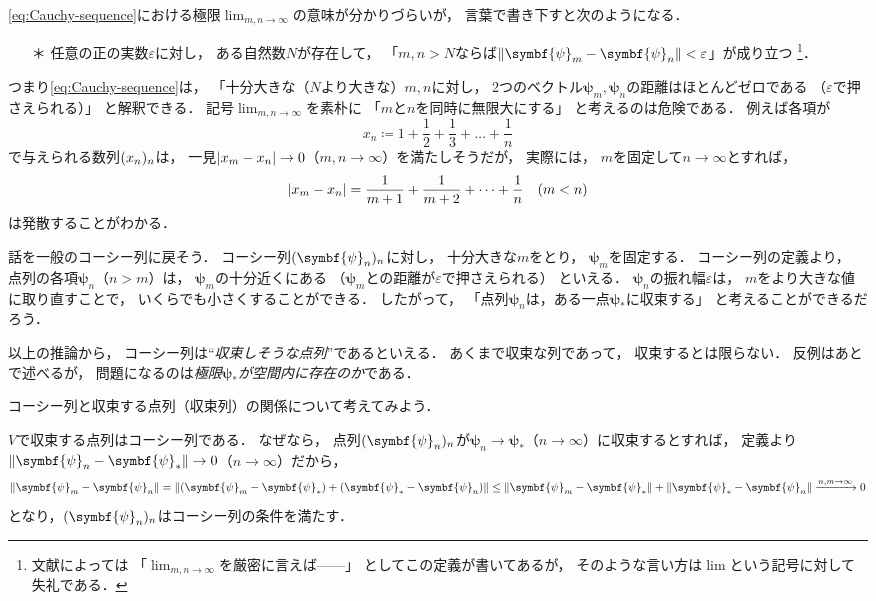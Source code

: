 \documentclass[
]{sotsu}
\newcommand{\bpsi}{\symbf{\psi}}
\newcommand{\fire}[1]{\textcolor{fire}{#1}}
\newcommand{\water}[1]{\textcolor{water}{#1}}
\begin{document}
\cref{eq:Cauchy-sequence}における極限$\lim_{m, n \to \infty}$の意味が分かりづらいが，
言葉で書き下すと次のようになる．
\begin{enumerate}
    \item [＊] \fire{任意の正の実数$\varepsilon$}に対し，
        \water{ある自然数$N$}が存在して，
        「$m, n > N$ならば$\norm{\bpsi_m - \bpsi_n} < \varepsilon$」が成り立つ%
        \footnote{
            文献によっては
            「$\lim_{m, n \to \infty}$を厳密に言えば------」
            としてこの定義が書いてあるが，
            そのような言い方は$\lim$という記号に対して失礼である．
        }．
\end{enumerate}
つまり\cref{eq:Cauchy-sequence}は，
「十分大きな{\small （$N$より大きな）}$m, n$に対し，
2つのベクトル$\bpsi_m, \bpsi_n$の距離はほとんどゼロである
{\small （$\varepsilon$で押さえられる）}」
と解釈できる．
記号$\lim_{m, n \to \infty}$を素朴に
「$m$と$n$を同時に無限大にする」
と考えるのは危険である．
例えば各項が
\begin{equation*}
    x_n \coloneq 1 + \frac{1}{2} + \frac{1}{3} + \dots + \frac{1}{n}
\end{equation*}
で与えられる数列$\sequ{x_n}[n]$は，
一見$\lvert x_m - x_n\rvert \to 0$（$m, n \to \infty$）を満たしそうだが，
実際には，
$m$を固定して$n \to \infty$とすれば，
\begin{equation*}
    \lvert x_m - x_n\rvert = \frac{1}{m+1} + \frac{1}{m+2} + \dots + \frac{1}{n}
    \quad (m < n)
\end{equation*}
は発散することがわかる．

話を一般のコーシー列に戻そう．
コーシー列$\sequ{\bpsi_n}[n]$に対し，
十分大きな$m$をとり，
$\bpsi_m$を固定する．
コーシー列の定義より，
点列の各項$\bpsi_n$（$n > m$）は，
$\bpsi_m$の十分近くにある
（$\bpsi_m$との距離が$\varepsilon$で押さえられる）
といえる．
$\bpsi_n$の振れ幅$\varepsilon$は，
$m$をより大きな値に取り直すことで，
いくらでも小さくすることができる．
したがって，
「点列$\bpsi_n$は，ある一点$\bpsi_*$に収束する」
と考えることができるだろう．

以上の推論から，
コーシー列は``\emph{収束しそうな点列}''であるといえる．
あくまで収束な列であって，
収束するとは限らない．
反例はあとで述べるが，
問題になるのは\emph{極限$\bpsi_*$が空間内に存在のか}である．

コーシー列と収束する点列（収束列）の関係について考えてみよう．

\quad 
$V$で収束する点列はコーシー列である．
なぜなら，
点列$\sequ{\bpsi_n}[n]$が$\bpsi_n \to \bpsi_*$（$n \to \infty$）に収束するとすれば，
定義より$\norm{\bpsi_n - \bpsi_*} \to 0$（$n \to \infty$）だから，
\begin{equation*}
    \norm{\bpsi_m - \bpsi_n}
    = \norm{(\bpsi_m - \bpsi_*) + (\bpsi_* - \bpsi_n)}
    \leq \norm{\bpsi_m - \bpsi_*} + \norm{\bpsi_* - \bpsi_n}
    \xrightarrow{n, m \to \infty} 0
\end{equation*}
となり，$\sequ{\bpsi_n}[n]$はコーシー列の条件を満たす．
\end{document}
